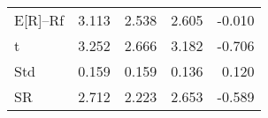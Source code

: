 \begin{tabular}{lrrrr}
\toprule
\midrule
E[R]--Rf & 3.113 & 2.538 & 2.605 & -0.010 \\
t & 3.252 & 2.666 & 3.182 & -0.706 \\
Std & 0.159 & 0.159 & 0.136 & 0.120 \\
SR & 2.712 & 2.223 & 2.653 & -0.589 \\
\bottomrule
\end{tabular}
